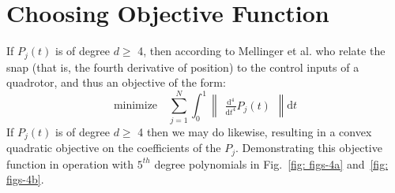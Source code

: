 \section{Choosing Objective Function}
If $P_{j}(t)$ is of degree $d \geq$ 4, then according to Mellinger et al. who relate the snap (that is, the fourth derivative
of position) to the control inputs of a quadrotor, and thus
an objective of the form: \begin{equation} \label{eq:eq18_deits}
\text{minimize} \quad \sum_{j=1}^{N} \int_{0}^{1}\begin{Vmatrix}\frac{\mathrm{d}^4 }{\mathrm{d} t^4}
P_{j}(t) 
\end{Vmatrix}{\mathrm{d}t}
\end{equation}
If $P_{j}(t)$ is of degree $d \geq$ 4 then we may do likewise, resulting
in a convex quadratic objective on the coefficients of the $P_{j}$.
Demonstrating this objective function in operation with $5^{th}$ degree polynomials in Fig.~\ref{fig: figs-4a} and~\ref{fig: figs-4b}.

